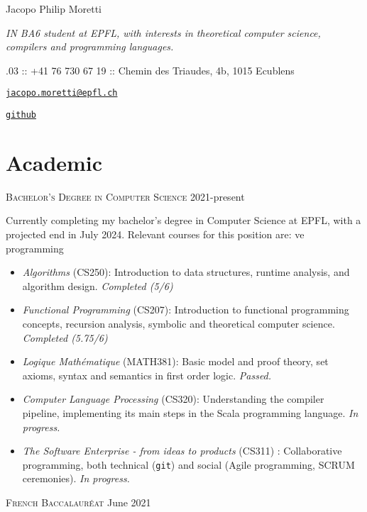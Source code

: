 \documentclass[11pt]{article}
\renewcommand{\url}[1]{{\texttt{#1}}}
\renewcommand{\line}[2]{{\vspace{4pt} \large \noindent\textsc{#1} \hfill #2}\vspace{4pt}}
\begin{document}
  \begin{center}
    \huge Jacopo Philip Moretti
  \end{center}

  \begin{adjustwidth}{1in}{1in}
    \textit{IN BA6 student at EPFL, with interests in theoretical computer science, compilers and programming languages.}

    .03 :: +41 76 730 67 19 :: Chemin des Triaudes, 4b, 1015 Ecublens
    
    \noindent \href{https://people.epfl.ch/jacopo.moretti}{\url{jacopo.moretti@epfl.ch}}
    
    \noindent \href{https://github.com/quartztz}{\url{github}}
  \end{adjustwidth}

  \section*{Academic}

  \line{Bachelor's Degree in Computer Science}{2021-present}

  Currently completing my bachelor's degree in Computer Science at EPFL, with a projected end in July 2024. Relevant courses for this position are: ve programming 
  \begin{itemize}
    \item \textit{Algorithms} (CS250): Introduction to data structures, runtime analysis, and algorithm design. \textit{Completed (5/6)}
    \item \textit{Functional Programming} (CS207): Introduction to functional programming concepts, recursion analysis, symbolic and theoretical computer science. \textit{Completed (5.75/6)}
    \item \textit{Logique Mathématique} (MATH381): Basic model and proof theory, set axioms, syntax and semantics in first order logic. \textit{Passed.}
    \item \textit{Computer Language Processing} (CS320): Understanding the compiler pipeline, implementing its main steps in the Scala programming language. \textit{In progress.}
    \item \textit{The Software Enterprise - from ideas to products} (CS311) : Collaborative programming, both technical (\texttt{git}) and social (Agile programming, SCRUM ceremonies). \textit{In progress.}
  \end{itemize}

  \line{French Baccalauréat}{June 2021}
\end{document}
